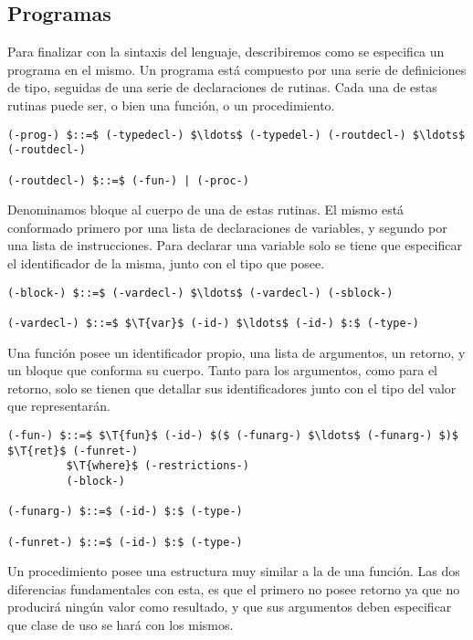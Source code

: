\documentclass{article}
\begin{document}
\subsection{Programas}

Para finalizar con la sintaxis del lenguaje, describiremos como se especifica un programa en el mismo.
Un programa está compuesto por una serie de definiciones de tipo, seguidas de una serie de declaraciones de rutinas.
Cada una de estas rutinas puede ser, o bien una función, o un procedimiento.

\begin{lstlisting}[style = syntax]
(-prog-) $::=$ (-typedecl-) $\ldots$ (-typedel-) (-routdecl-) $\ldots$ (-routdecl-)

(-routdecl-) $::=$ (-fun-) | (-proc-)
\end{lstlisting}

Denominamos bloque al cuerpo de una de estas rutinas.
El mismo está conformado primero por una lista de declaraciones de variables, y segundo por una lista de instrucciones.
Para declarar una variable solo se tiene que especificar el identificador de la misma, junto con el tipo que posee.

\begin{lstlisting}[style = syntax]
(-block-) $::=$ (-vardecl-) $\ldots$ (-vardecl-) (-sblock-)

(-vardecl-) $::=$ $\T{var}$ (-id-) $\ldots$ (-id-) $:$ (-type-)
\end{lstlisting}

Una función posee un identificador propio, una lista de argumentos, un retorno, y un bloque que conforma su cuerpo.
Tanto para los argumentos, como para el retorno, solo se tienen que detallar sus identificadores junto con el tipo del valor que representarán.

\begin{lstlisting}[style = syntax]
(-fun-) $::=$ $\T{fun}$ (-id-) $($ (-funarg-) $\ldots$ (-funarg-) $)$ $\T{ret}$ (-funret-)
         $\T{where}$ (-restrictions-)
         (-block-)

(-funarg-) $::=$ (-id-) $:$ (-type-)

(-funret-) $::=$ (-id-) $:$ (-type-)
\end{lstlisting}

Un procedimiento posee una estructura muy similar a la de una función.
Las dos diferencias fundamentales con esta, es que el primero no posee retorno ya que no producirá ningún valor como resultado, y que sus argumentos deben especificar que clase de uso se hará con los mismos.
\end{document}
